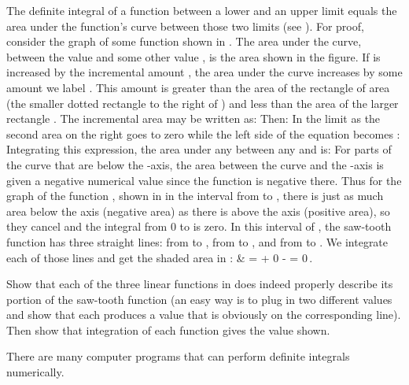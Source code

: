{
The definite integral of a function between a lower and an upper limit equals the area under
the function's curve between those two limits (see ).
For proof, consider the graph of some function  shown in .
The area under the curve, between the value  and some other value ,
is the area  shown in the figure.
If  is increased by the incremental amount , the area under the
curve increases by some amount we label .
This amount  is greater than the area of the rectangle of area
 (the smaller dotted rectangle to the right of ) and less than the area of the
larger rectangle .
The incremental area may be written as:
%
%
Then:
%
%
In the limit as  the second area on the right goes
to zero while the left side of the equation becomes :
%
%
Integrating this expression, the area under any  between any  and
 is:
%
%
For parts of the curve that are below the -axis, the area between the
curve and the -axis is given a negative numerical value since the
function is negative there.
Thus for the graph of the  function , shown in  in the interval
from  to , there is just as much area below the axis
(negative area) as there is above the axis (positive area), so they cancel
and the integral from 0 to  is zero.
In this interval of , the saw-tooth function has three straight lines:
from  to , from  to , and from  to .
We integrate each of those lines and get the shaded area in :
%
 {& =  + 0 -  = 0\,.}
%

%
\tryit Show that each of the three linear functions in  does indeed properly describe its
portion of the saw-tooth function (an easy way is to plug in two different  values and show that
each produces a  value that is obviously on the corresponding line).
Then show that integration of each function gives the value shown.

There are many computer programs that can perform definite integrals numerically.
%
} %
